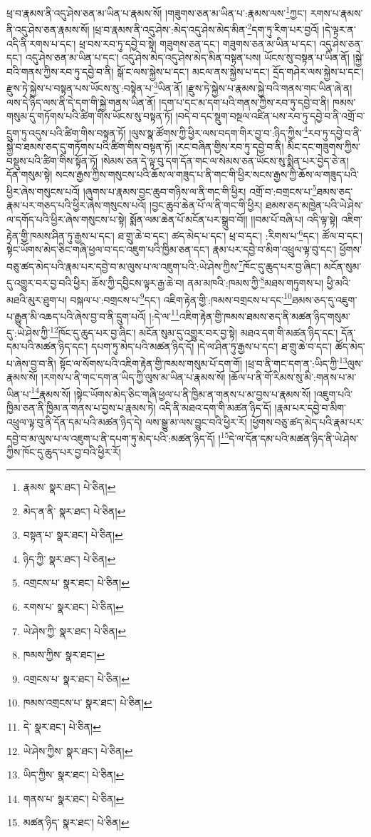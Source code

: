 ཕྲ་བ་རྣམས་ནི་འདུ་ཤེས་ཅན་མ་ཡིན་པ་རྣམས་སོ། །གཟུགས་ཅན་མ་ཡིན་པ་:རྣམས་ལས་\footnote{རྣམས་  སྣར་ཐང་།  པེ་ཅིན། }ཀྱང་། རགས་པ་རྣམས་ནི་འདུ་ཤེས་ཅན་རྣམས་སོ། །ཕྲ་བ་རྣམས་ནི་འདུ་ཤེས་:མེད་འདུ་ཤེས་མེད་མིན་\footnote{མེད་ན་ནི་  སྣར་ཐང་།  པེ་ཅིན། }དག་ཏུ་རིག་པར་བྱའོ། །དེ་ལྟར་ན་འདི་ནི་རགས་པ་དང་། ཕྲ་བས་རབ་ཏུ་དབྱེ་བ་སྟེ། གཟུགས་ཅན་དང་། གཟུགས་ཅན་མ་ཡིན་པ་དང་། འདུ་ཤེས་ཅན་དང་། འདུ་ཤེས་ཅན་མ་ཡིན་པ་དང་། འདུ་ཤེས་མེད་འདུ་ཤེས་མེད་མིན་བསྟན་པས། ཡོངས་སུ་བསྟན་པ་ཡིན་ནོ། །སྐྱེ་བའི་གནས་ཀྱིས་རབ་ཏུ་དབྱེ་བ་ནི། སྒོ་ང་ལས་སྐྱེས་པ་དང་། མངལ་ནས་སྐྱེས་པ་དང་། དྲོད་གཤེར་ལས་སྐྱེས་པ་དང་། རྫུས་ཏེ་སྐྱེས་པ་བསྟན་པས་ཡོངས་སུ་:བསྟེན་པ་\footnote{བསྟན་པ་  སྣར་ཐང་།  པེ་ཅིན། }ཡིན་ནོ། །རྫུས་ཏེ་སྐྱེས་པ་རྣམས་སྐྱེ་བའི་གནས་གང་ཡིན་ཞེ་ན། ལས་དེ་ཉིད་ལས་ནི་དེ་དག་གི་སྐྱེ་གནས་ཡིན་ནོ། །དག་པ་དང་མ་དག་པའི་གནས་ཀྱིས་རབ་ཏུ་དབྱེ་བ་ནི། ཁམས་གསུམ་དུ་གཏོགས་པའི་ཚིག་གིས་ཡོངས་སུ་བསྟན་ཏོ། །བདེ་བ་དང་སྡུག་བསྔལ་འཛིན་པས་རབ་ཏུ་དབྱེ་བ་ནི་འགྲོ་བ་དྲུག་ཏུ་འདུས་པའི་ཚིག་གིས་བསྟན་ཏོ། །ལུས་སྣ་ཚོགས་ཀྱི་ཕྱིར་ལས་བདག་གིར་བྱ་བ་:ཉིད་ཀྱིས་\footnote{ཉིད་ཀྱི་  སྣར་ཐང་།  པེ་ཅིན། }རབ་ཏུ་དབྱེ་བ་ནི་སྐྱེ་བ་ཐམས་ཅད་དུ་གཏོགས་པའི་ཚིག་གིས་བསྟན་ཏོ། །རང་བཞིན་གྱིས་རབ་ཏུ་དབྱེ་བ་ནི། མིང་དང་གཟུགས་ཀྱིས་བསྡུས་པའི་ཚིག་གིས་སྟོན་ཏོ། །སེམས་ཅན་དེ་ལྟ་བུ་དག་དོན་གང་ལ་སེམས་ཅན་ཡོངས་སུ་སྨིན་པར་བྱེད་ཅེ་ན། དོན་གསུམ་སྟེ། སངས་རྒྱས་ཀྱིས་གསུངས་པའི་ཆོས་ལ་གཟུད་པ་ནི་གང་གི་ཕྱིར་སངས་རྒྱས་ཀྱི་ཆོས་ལ་གཟུད་པའི་ཕྱིར་ཞེས་གསུངས་པའོ། །ཞུགས་པ་རྣམས་བྱང་ཆུབ་གཉིས་ལ་ནི་གང་གི་ཕྱིར། འགྲོ་བ་:བགྲངས་པ་\footnote{འགྲངས་པ་  སྣར་ཐང་།  པེ་ཅིན། }ཐམས་ཅད་རྣམ་པར་གཅད་པའི་ཕྱིར་ཞེས་གསུངས་པའོ། །བྱང་ཆུབ་ཆེན་པོ་ལ་ནི་གང་གི་ཕྱིར། ཐམས་ཅད་མཁྱེན་པའི་ཡེ་ཤེས་ལ་དགོད་པའི་ཕྱིར་ཞེས་གསུངས་པ་སྟེ། སྨོན་ལམ་ཆེན་པོ་མངོན་པར་སྒྲུབ་བོ།། །།བམ་པོ་བཞི་པ། འདི་ལྟ་སྟེ། འཇིག་རྟེན་གྱི་ཁམས་ཤིན་ཏུ་རྒྱས་པ་དང་། ཐ་གྲུ་ཆེ་བ་དང་། ཚད་མེད་པ་དང་། ཕྲ་བ་དང་། :རིགས་པ་\footnote{རགས་པ་  སྣར་ཐང་།  པེ་ཅིན། }དང་། ཚོལ་བ་དང་། སྟེང་ཡོགས་མེད་ཅིང་གཞི་ཕྱལ་བ་དང་འཇུག་པའི་ཁྱིམ་ཅན་དང་། རྣམ་པར་དབྱེ་བ་མིག་འཕྲུལ་ལྟ་བུ་དང་། ཕྱོགས་བཅུ་ཚད་མེད་པའི་རྣམ་པར་དབྱེ་བ་མ་ལུས་པ་ལ་འཇུག་པའི་:ཡེ་ཤེས་ཀྱིས་\footnote{ཡེ་ཤེས་ཀྱི་  སྣར་ཐང་།  པེ་ཅིན། }ཁོང་དུ་ཆུད་པར་བྱ་ཞིང་། མངོན་སུམ་དུ་འགྱུར་བར་བྱ་བའི་ཕྱིར། ཆོས་ཀྱི་དབྱིངས་ལྟར་རྒྱ་ཆེ་བ། ནམ་མཁའི་:ཁམས་ཀྱི་\footnote{ཁམས་ཀྱིས་  སྣར་ཐང་། }མཐས་གཏུགས་པ། ཕྱི་མའི་མཐའི་མུར་ཐུག་པ། བསྐལ་པ་:བགྲངས་པ་\footnote{འགྲངས་པ་  སྣར་ཐང་།  པེ་ཅིན། }དང་། འཇིག་རྟེན་གྱི་:ཁམས་བགྲངས་པ་དང་\footnote{ཁམས་འགྲངས་པ་  སྣར་ཐང་།  པེ་ཅིན། }ཐམས་ཅད་དུ་འཇུག་པ་རྒྱུན་མི་འཆད་པའི་ཞེས་བྱ་བ་ནི་དྲུག་པའོ། །:དེ་ལ་\footnote{དེ་  སྣར་ཐང་།  པེ་ཅིན། }འཇིག་རྟེན་གྱི་ཁམས་ཐམས་ཅད་ནི་མཚན་ཉིད་གསུམ་དུ་:ཡེ་ཤེས་ཀྱི་\footnote{ཡེ་ཤེས་ཀྱིས་  སྣར་ཐང་།  པེ་ཅིན། }ཁོང་དུ་ཆུད་པར་བྱ་ཞིང་། མངོན་སུམ་དུ་འགྱུར་བར་བྱ་སྟེ། མཐའ་དག་གི་མཚན་ཉིད་དང་། དོན་དམ་པའི་མཚན་ཉིད་དང་། དཔག་ཏུ་མེད་པའི་མཚན་ཉིད་དོ། །དེ་ལ་ཤིན་ཏུ་རྒྱས་པ་དང་། ཐ་གྲུ་ཆེ་བ་དང་། ཚོད་མེད་པ་ཞེས་བྱ་བ་ནི། སྟོང་ལ་སོགས་པའི་འཇིག་རྟེན་གྱི་ཁམས་གསུམ་པོ་དག་གོ། །ཕྲ་བ་ནི་གང་དག་ན་:ཡིད་ཀྱི་\footnote{ཡིད་ཀྱིས་  སྣར་ཐང་།  པེ་ཅིན། }ལུས་རྣམས་སོ། །རགས་པ་ནི་གང་དག་ན་ཡིད་ཀྱི་ལུས་མ་ཡིན་པ་རྣམས་སོ། །ཆོལ་པ་ནི་གོ་རིམས་སུ་མི་:གནས་པ་མ་ཡིན་པ་\footnote{གནས་པ་  སྣར་ཐང་།  པེ་ཅིན། }རྣམས་སོ། །སྟེང་ཡོགས་མེད་ཅིང་གཞི་ཕྱལ་པ་ནི་ཁྱིམ་ན་གནས་པ་མ་བྱས་པ་རྣམས་སོ། །འཇུག་པའི་ཁྱིམ་ཅན་ནི་ཁྱིམ་ན་གནས་པ་བྱས་པ་རྣམས་ཏེ། འདི་ནི་མཐའ་དག་གི་མཚན་ཉིད་དོ། །རྣམ་པར་དབྱེ་བ་མིག་འཕྲུལ་ལྟ་བུ་ནི་དོན་དམ་པའི་མཚན་ཉིད་དེ། ལས་སྒྱུ་མ་ལས་བྱུང་བའི་ཕྱིར་རོ། །ཕྱོགས་བཅུ་ཚད་མེད་པའི་རྣམ་པར་དབྱེ་བ་མ་ལུས་པ་ལ་འཇུག་པ་ནི་དཔག་ཏུ་མེད་པའི་:མཚན་ཉིད་དོ། །\footnote{མཚན་ཉིད་  སྣར་ཐང་།  པེ་ཅིན། }དེ་ལ་དོན་དམ་པའི་མཚན་ཉིད་ནི་ཡེ་ཤེས་ཀྱིས་ཁོང་དུ་ཆུད་པར་བྱ་བའི་ཕྱིར་རོ། 